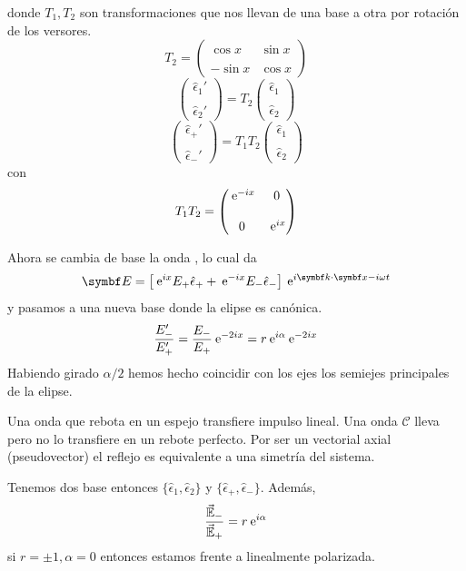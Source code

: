 \documentclass[10pt,oneside]{CBFT_book}
\begin{document}
donde $T_1, T_2$ son transformaciones que nos llevan de una base a otra por
rotación de los versores.
\[
	T_2 = 	\begin{pmatrix}
	\cos x & \sin x \\
	\\
	- \sin x & \cos x 
	\end{pmatrix}
\]
\[
	\begin{pmatrix}
	\hat{\epsilon}_1' \\
	\\
	\hat{\epsilon}_2'
	\end{pmatrix} =
	T_2
	\begin{pmatrix}
	\hat{\epsilon}_1 \\
	\\
	\hat{\epsilon}_2
	\end{pmatrix}
\]
\[
	\begin{pmatrix}
	\hat{\epsilon}_+' \\
	\\
	\hat{\epsilon}_-'
	\end{pmatrix} =
	T_1 T_2
	\begin{pmatrix}
	\hat{\epsilon}_1 \\
	\\
	\hat{\epsilon}_2
	\end{pmatrix}
\]
con
\[
	T_1 T_2 = \begin{pmatrix}
	\:\mathrm{e}^{-ix} & 0 \\
	\\
	0 & \:\mathrm{e}^{ix}
	\end{pmatrix}
\]

Ahora se cambia de base la onda , lo cual da
\[
	\vb{E} = \left[ \euler^{ix} E_+ \hat{\epsilon}_+ + \euler^{-ix} E_- \hat{\epsilon}_- \right]
	\euler^{i \pe{k}{x} - i \omega t}
\]
y pasamos a una nueva base donde la elipse es canónica.
\[
	\frac{E_-'}{E_+'} = \frac{E_-}{E_+} \:\mathrm{e}^{-2 i x} = r \:\mathrm{e}^{ i \alpha} \:\mathrm{e}^{-2 i x}
\]
Habiendo girado $\alpha/2$ hemos hecho coincidir con los ejes los semiejes principales
de la elipse.

Una onda que rebota en un espejo transfiere impulso lineal. Una onda $\mathcal{C}$ lleva  pero no lo transfiere 
en un rebote perfecto. Por ser  un vectorial axial (pseudovector) el reflejo es equivalente a una simetría del 
sistema.

Tenemos dos base entonces $\{ \hat{\epsilon}_1 ,\hat{\epsilon}_2 \}$ y $\{ \hat{\epsilon}_+ ,\hat{\epsilon}_- \}$.
Además,
\[
	\frac{\vec{\mathbb{E}}_-}{\vec{\mathbb{E}}_+} = r\:\mathrm{e}^{i\alpha} 
\]
si $r = \pm 1, \alpha=0 $ entonces estamos frente a linealmente polarizada.
\end{document}

